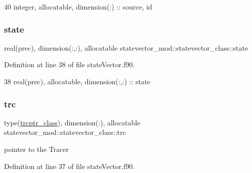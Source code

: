 \begin{DoxyCode}
40         \textcolor{keywordtype}{integer}, \textcolor{keywordtype}{allocatable}, \textcolor{keywordtype}{dimension(:)} :: source, id
\end{DoxyCode}
\mbox{\label{structstatevector__mod_1_1statevector__class_a2934e9cc937ca318cbbe490dd391cf88}} 
\subsubsection{\texorpdfstring{state}{state}}
{\footnotesize\ttfamily real(prec), dimension(\+:,\+:), allocatable statevector\+\_\+mod\+::statevector\+\_\+class\+::state\hspace{0.3cm}{\ttfamily [private]}}



Definition at line 38 of file state\+Vector.\+f90.


\begin{DoxyCode}
38         \textcolor{keywordtype}{real(prec)}, \textcolor{keywordtype}{allocatable}, \textcolor{keywordtype}{dimension(:,:)} :: state
\end{DoxyCode}
\mbox{\label{structstatevector__mod_1_1statevector__class_a510497a5645951832de30b8fd89a1d33}} 
\subsubsection{\texorpdfstring{trc}{trc}}
{\footnotesize\ttfamily type(\mbox{\hyperlink{structstatevector__mod_1_1trcptr__class}{trcptr\+\_\+class}}), dimension(\+:), allocatable statevector\+\_\+mod\+::statevector\+\_\+class\+::trc\hspace{0.3cm}{\ttfamily [private]}}



pointer to the Tracer 



Definition at line 37 of file state\+Vector.\+f90.


